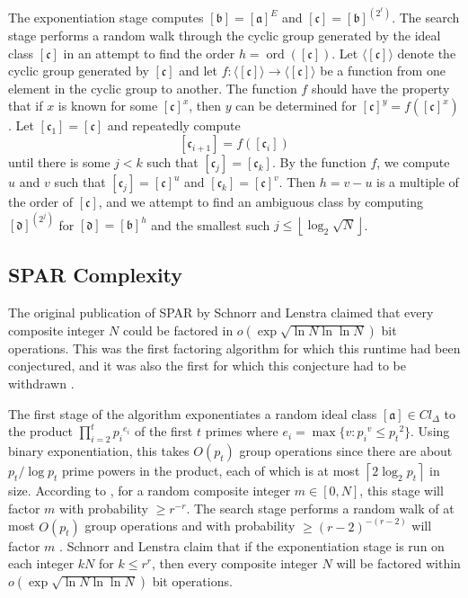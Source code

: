 \documentclass{ucalgthes1}
\theoremstyle{definition}
\DeclareMathOperator{\ord}{ord}
\newcommand{\floor}[1]{\left\lfloor #1 \right\rfloor}
\newcommand{\ceil}[1]{\left\lceil #1 \right\rceil}
\newcommand{\ideal}{\mathfrak}
\newcommand{\idealclass}[1]{\left[ \ideal #1 \right]}
\newcommand{\aclass}{\idealclass a}
\newcommand{\bclass}{\idealclass b}
\newcommand{\cclass}{\idealclass c}
\newcommand{\dclass}{\idealclass d}
\begin{document}
The exponentiation stage computes $\bclass = \aclass^E$ and $\cclass = \bclass^{\left(2^\ell\right)}$.  The search stage performs a random walk through the cyclic group generated by the ideal class $\cclass$ in an attempt to find the order $h = \ord(\cclass)$.  Let $\langle \cclass \rangle$ denote the cyclic group generated by $\cclass$ and let $f : \langle \cclass \rangle \rightarrow \langle \cclass \rangle$ be a function from one element in the cyclic group to another.  The function $f$ should have the property that if $x$ is known for some $\cclass ^x$, then $y$ can be determined for $\cclass^y = f(\cclass^x)$.  Let $[\mathfrak c_1] = \cclass$ and repeatedly compute
\[
	[\mathfrak c_{i+1}] = f([\mathfrak c_i])
\]
until there is some $j < k$ such that $[\mathfrak c_j] = [\mathfrak c_k]$.  By the function $f$, we compute $u$ and $v$ such that $[\mathfrak c_j]=\cclass^u$ and $[\mathfrak c_k]=\cclass^v$.  Then $h = v - u$ is a multiple of the order of $\cclass$, and we attempt to find an ambiguous class by computing $\dclass^{\left(2^j\right)}$ for $\dclass = \bclass^h$ and the smallest such $j \le \floor{\log_2{\sqrt N}}$.

\subsection{SPAR Complexity}


The original publication of SPAR by Schnorr and Lenstra \cite{Schnorr1984} claimed that every composite integer $N$ could be factored in $o\left(\exp\sqrt{\ln N \ln\ln N}\right)$ bit operations.  This was the first factoring algorithm for which this runtime had been conjectured, and it was also the first for which this conjecture had to be withdrawn \cite{Lenstra1992}.

The first stage of the algorithm exponentiates a random ideal class $\aclass \in Cl_\Delta$ to the product $\prod_{i=2}^t {p_i}^{e_i}$ of the first $t$ primes where $e_i = \max \{ v : {p_i}^v \le {p_t}^2 \}$.  Using binary exponentiation, this takes $O(p_t)$ group operations since there are about $p_t / \log p_t$ prime powers in the product, each of which is at most $\ceil{2 \log_2 p_t}$ in size. According to \cite[p.290]{Schnorr1984}, for a random composite integer $m \in [0, N]$, this stage will factor $m$ with probability $\ge r^{-r}$.  The search stage performs a random walk of at most $O(p_t)$ group operations and with probability $\ge (r-2)^{-(r-2)}$ will factor $m$ \cite[p.290]{Schnorr1984}.  Schnorr and Lenstra \cite[p.290]{Schnorr1984} claim that if the exponentiation stage is run on each integer $kN$ for $k \le r^r$, then every composite integer $N$ will be factored within $o\left(\exp \sqrt{ \ln N \ln\ln N } \right)$ bit operations.
\end{document}
